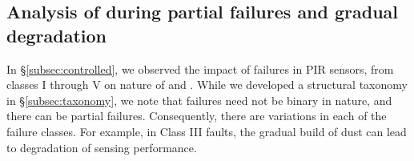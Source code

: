 \subsection{Analysis of \aout during partial failures and gradual degradation} \label{subsec:incremental_dust}In \S\ref{subsec:controlled}, we observed the impact of failures in PIR sensors, from classes I through V on nature of \aout and \cout. While we developed a structural taxonomy in \S\ref{subsec:taxonomy}, we note that failures need not be binary in nature, and there can be partial failures. Consequently, there are variations in each of the failure classes. %
For example, in Class III faults, the gradual build of dust can lead to degradation of sensing performance. %
